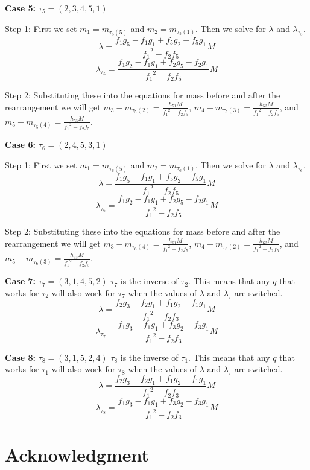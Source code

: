 \documentclass[11pt,leqno]{article}
\theoremstyle{definition}
\theoremstyle{remark}
\numberwithin{equation}{section}
\begin{document}
\textbf{Case 5:} $\tau_5=(2,3,4,5,1)$

Step 1: First we set $m_1=m_{\tau_5(5)}$ and $m_2=m_{\tau_5(1)}$. Then we solve for $\lambda$ and $\lambda_{\tau_5}$. 
$$\lambda=\frac{f_1g_5-f_1g_1+f_5g_2-f_5g_1}{{f_1}^2-f_2f_5}M$$
$$\lambda_{\tau_5}=\frac{f_1g_2-f_1g_1+f_2g_5-f_2g_1}{{f_1}^2-f_2f_5}M$$

Step 2: Substituting these into the equations for mass before and after the rearrangement we will get $m_3-m_{\tau_5(2)}=\frac{h_{51}M}{{f_1}^2-f_2f_5}$, $m_4-m_{\tau_5(3)}=\frac{h_{52}M}{{f_1}^2-f_2f_5}$, and $m_5-m_{\tau_5(4)}=\frac{h_{53}M}{{f_1}^2-f_2f_5}$.

\textbf{Case 6:} $\tau_6=(2,4,5,3,1)$

Step 1: First we set $m_1=m_{\tau_6(5)}$ and $m_2=m_{\tau_6(1)}$. Then we solve for $\lambda$ and $\lambda_{\tau_6}$. 
$$\lambda=\frac{f_1g_5-f_1g_1+f_5g_2-f_5g_1}{{f_1}^2-f_2f_5}M$$
$$\lambda_{\tau_6}=\frac{f_1g_2-f_1g_1+f_2g_5-f_2g_1}{{f_1}^2-f_2f_5}M$$

Step 2: Substituting these into the equations for mass before and after the rearrangement we will get $m_3-m_{\tau_6(4)}=\frac{h_{61}M}{{f_1}^2-f_2f_5}$, $m_4-m_{\tau_6(2)}=\frac{h_{62}M}{{f_1}^2-f_2f_5}$, and $m_5-m_{\tau_6(3)}=\frac{h_{63}M}{{f_1}^2-f_2f_5}$.

\textbf{Case 7:} $\tau_7=(3,1,4,5,2)$
$\tau_7$ is the inverse of $\tau_2$. This means that any $q$ that works for $\tau_2$ will also work for $\tau_7$ when the values of $\lambda$ and $\lambda_\tau$ are switched.
$$\lambda=\frac{f_2g_3-f_2g_1+f_1g_2-f_1g_1}{{f_1}^2-f_2f_3}M$$
$$\lambda_{\tau_7}=\frac{f_1g_3-f_1g_1+f_3g_2-f_3g_1}{{f_1}^2-f_2f_3}M$$

\textbf{Case 8:} $\tau_8=(3,1,5,2,4)$
$\tau_8$ is the inverse of $\tau_1$. This means that any $q$ that works for $\tau_1$ will also work for $\tau_8$ when the values of $\lambda$ and $\lambda_\tau$ are switched.
$$\lambda=\frac{f_2g_3-f_2g_1+f_1g_2-f_1g_1}{{f_1}^2-f_2f_3}M$$
$$\lambda_{\tau_8}=\frac{f_1g_3-f_1g_1+f_3g_2-f_3g_1}{{f_1}^2-f_2f_3}M$$

\section*{Acknowledgment}


\end{document}

